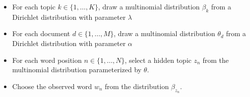 {\begin{itemize}
\item<1-> For each topic $k \in \{1, \dots, K\}$, draw a multinomial distribution $\beta_k$ from a Dirichlet distribution with parameter $\lambda$
\item<2-> For each document $d \in \{1, \dots, M\}$, draw a multinomial distribution $\theta_d$ from a Dirichlet distribution with parameter $\alpha$
\item<3-> For each word position $n \in \{1, \dots, N\}$, select a hidden topic $z_n$ from the multinomial distribution parameterized by $\theta$.
\item<4-> Choose the observed word $w_n$ from the distribution $\beta_{z_n}$.
\end{itemize}

}

\fi

\ifevaluation



